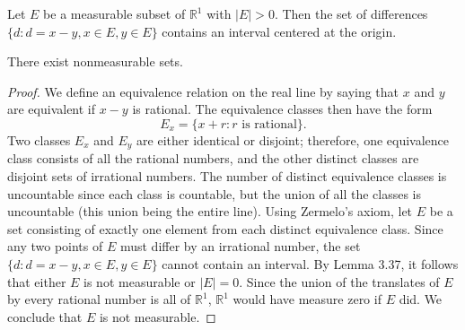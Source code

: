 \documentclass[UTF8,a4paper,10pt]{article}
\begin{document}
\begin{mybox}{}
    \setcounter{theorem}{36}
    \begin{lemma}
      Let $E$ be a measurable subset of $\mathbb{R}^1$ with $|E| > 0$. Then the set of differences $\{d : d = x - y, x \in E, y \in E\}$ contains an interval centered at the origin.
      \end{lemma}
      

    \begin{theorem}[Vitali]
      There exist nonmeasurable sets.
      \end{theorem}
    
      \begin{proof}
        We define an equivalence relation on the real line by saying that $x$ and $y$ are equivalent if $x - y$ is rational. The equivalence classes then have the form
        \[
        E_x = \{x + r : r \text{ is rational}\}.
        \]
        Two classes $E_x$ and $E_y$ are either identical or disjoint;
        therefore, one equivalence class consists of all the rational numbers, and the
  other distinct classes are disjoint sets of irrational numbers. The number of
  distinct equivalence classes is uncountable since each class is countable, but
  the union of all the classes is uncountable (this union being the entire line).
  Using Zermelo's axiom, let $E$ be a set consisting of exactly one element
  from each distinct equivalence class. Since any two points of $E$ must differ by
  an irrational number, the set $\{d : d = x - y, x \in E, y \in E\}$ cannot contain an
  interval. By Lemma 3.37, it follows that either $E$ is not measurable or $|E| = 0$.
  Since the union of the translates of $E$ by every rational number is all of $\mathbb{R}^1$, $\mathbb{R}^1$
  would have measure zero if $E$ did. We conclude that $E$ is not measurable.

      \end{proof}

    \end{mybox}
\end{document}
